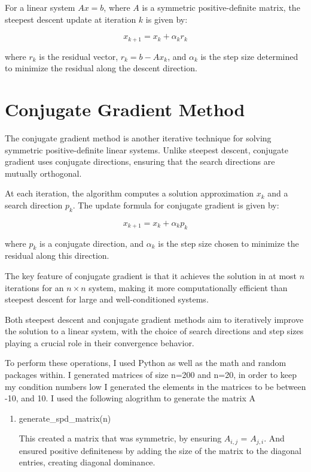 \documentclass[12pt, letterpaper]{article}
\begin{document}
For a linear system $Ax = b$, where $A$ is a symmetric positive-definite matrix, the steepest descent update at iteration $k$ is given by:

\[
x_{k+1} = x_k + \alpha_k r_k
\]

where $r_k$ is the residual vector, $r_k = b - Ax_k$, and $\alpha_k$ is the step size determined to minimize the residual along the descent direction.

\section*{Conjugate Gradient Method}

The conjugate gradient method is another iterative technique for solving symmetric positive-definite linear systems. Unlike steepest descent, conjugate gradient uses conjugate directions, ensuring that the search directions are mutually orthogonal.

At each iteration, the algorithm computes a solution approximation $x_k$ and a search direction $p_k$. The update formula for conjugate gradient is given by:

\[
x_{k+1} = x_k + \alpha_k p_k
\]

where $p_k$ is a conjugate direction, and $\alpha_k$ is the step size chosen to minimize the residual along this direction.

The key feature of conjugate gradient is that it achieves the solution in at most $n$ iterations for an $n \times n$ system, making it more computationally efficient than steepest descent for large and well-conditioned systems.

Both steepest descent and conjugate gradient methods aim to iteratively improve the solution to a linear system, with the choice of search directions and step sizes playing a crucial role in their convergence behavior.

To perform these operations, I used Python as well as the math and random packages within. I generated matrices of size n=200 and n=20, in order to keep my condition numbers low I generated the elements in the matrices to be between -10, and 10. I used the following alogrithm to generate the matrix A

\begin{enumerate}
   \item generate\_spd\_matrix(n)
   
         This created a matrix that was symmetric, by ensuring $A_{i,j}$ = $A_{j,i}$. And ensured positive definiteness by adding the size of the matrix to the diagonal entries, creating diagonal dominance.

\end{enumerate}
\end{document}
